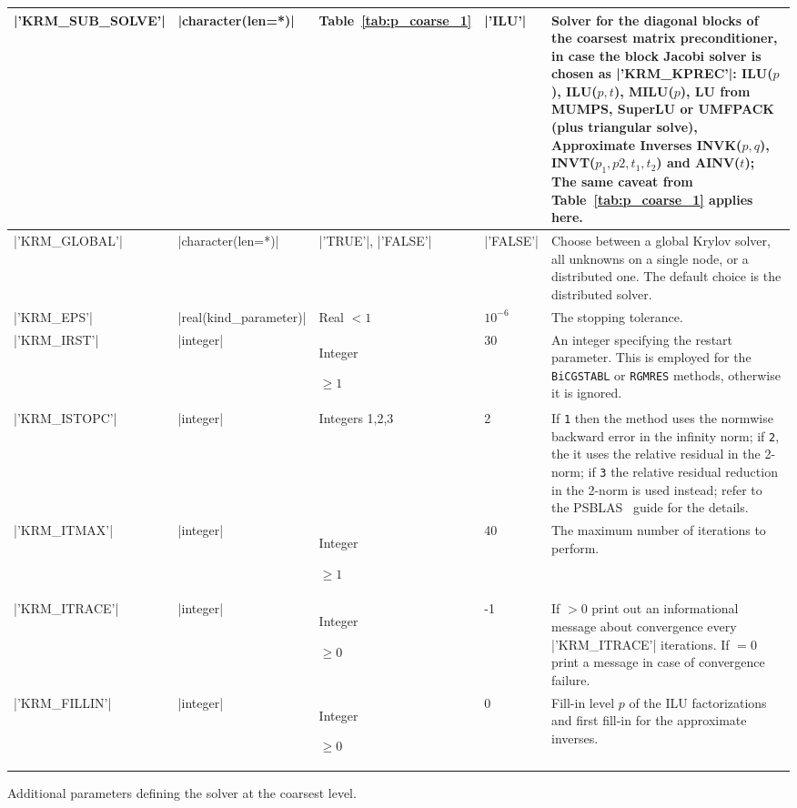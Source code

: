 \begin{center}
\begin{tabular}{|p{3.5cm}|l|p{1.7cm}|p{1.4cm}|p{8.6cm}|}
\hline
\fi     
		\fortinline|'KRM_SUB_SOLVE'|  & \fortinline|character(len=*)| & Table~\ref{tab:p_coarse_1} & \fortinline|'ILU'| & Solver for the diagonal blocks of the coarsest matrix preconditioner,
		in case the block Jacobi solver
		is chosen as \fortinline|'KRM_KPREC'|: ILU($p$), ILU($p,t$),
		MILU($p$), LU from MUMPS, SuperLU or UMFPACK
		(plus triangular solve), Approximate
		Inverses  INVK($p,q$), INVT($p_1,p2,t_1,t_2$) and
		AINV($t$); The same caveat from Table~\ref{tab:p_coarse_1} applies here. \\ \hline
		\fortinline|'KRM_GLOBAL'|  & \fortinline|character(len=*)| & \fortinline|'TRUE'|, \fortinline|'FALSE'|  & \fortinline|'FALSE'| & Choose between a global Krylov solver, all unknowns on a single node, or a distributed one. The default choice is the distributed solver.  \\ \hline                      
		\fortinline|'KRM_EPS'|  & \fortinline|real(kind_parameter)| & Real $< 1$ & $10^{-6}$ & The stopping tolerance. \\ \hline
		\fortinline|'KRM_IRST'|  & \fortinline|integer|  & Integer \par $\ge 1$ & 30 & An integer specifying the restart parameter. This is employed for the \texttt{BiCGSTABL} or \texttt{RGMRES} methods, otherwise it is ignored. \\ \hline
		\fortinline|'KRM_ISTOPC'|  & \fortinline|integer|  & Integers 1,2,3 & 2 & If \texttt{1} then the method uses the normwise backward error in the infinity
		norm; if \texttt{2}, the it uses the relative residual in the 2-norm; if \texttt{3} the relative residual reduction in the 2-norm is used instead; refer to the PSBLAS~\cite{PSBLASGUIDE} guide for the details. \\ \hline
		\fortinline|'KRM_ITMAX'|  & \fortinline|integer|   & Integer \par $\ge 1$ & 40 & The maximum number of iterations to perform. \\ \hline
		\fortinline|'KRM_ITRACE'|  & \fortinline|integer|  & Integer \par $\ge 0$ & -1 & If $>0$  print out an informational message about
		convergence  every \fortinline|'KRM_ITRACE'| iterations. If $=0$ print a message in
		case of convergence failure. \\ \hline
		\fortinline|'KRM_FILLIN'| & \fortinline|integer|  & Integer \par $\ge 0$
		& 0
		& Fill-in level $p$ of the ILU factorizations
		and first fill-in for the approximate inverses. \\ \hline
	\end{tabular}
\end{center}
\caption{Additional parameters defining the solver at the coarsest
	level.\label{tab:p_coarse_2}}
\esideways

